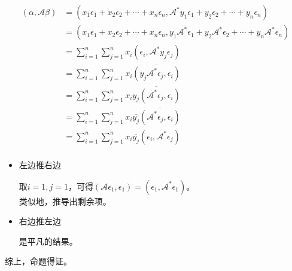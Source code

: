 \documentclass{article}
\begin{document}
\begin{align*}
  (\alpha, \mathscr{A}\beta)
   & = (x_1 \epsilon_1 + x_2 \epsilon_2 + \cdots + x_n \epsilon_n, \mathscr{A}^* y_1 \epsilon_1 + y_2 \epsilon_2 + \cdots + y_n \epsilon_n)                           \\
   & = (x_1 \epsilon_1 + x_2 \epsilon_2 + \cdots + x_n \epsilon_n, y_1 \mathscr{A}^* \epsilon_1 + y_2 \mathscr{A}^*\epsilon_2 + \cdots + y_n \mathscr{A}^*\epsilon_n) \\
   & = \sum \limits_{i = 1}^n \sum \limits_{j = 1}^n x_i (\epsilon_i, \mathscr{A}^* y_j \epsilon_j)                                                                   \\
   & = \sum \limits_{i = 1}^n \sum \limits_{j = 1}^n x_i \overline{(y_j \mathscr{A}^* \epsilon_j, \epsilon_i)}                                                        \\
   & = \sum \limits_{i = 1}^n \sum \limits_{j = 1}^n x_i \overline{y_j(\mathscr{A}^* \epsilon_j, \epsilon_i)}                                                         \\
   & = \sum \limits_{i = 1}^n \sum \limits_{j = 1}^n x_i \overline{y_j}\overline{(\mathscr{A}^* \epsilon_j, \epsilon_i)}                                              \\
   & = \sum \limits_{i = 1}^n \sum \limits_{j = 1}^n x_i \overline{y_j}(\epsilon_i, \mathscr{A}^* \epsilon_j)                                                         \\
\end{align*}
\begin{itemize}
  \item 左边推右边

        取$i = 1, j = 1$，可得$(\mathscr{A}\epsilon_1, \epsilon_1) = (\epsilon_1, \mathscr{A}^*\epsilon_1)$。 \\
        类似地，推导出剩余项。

  \item 右边推左边

        是平凡的结果。
\end{itemize}
综上，命题得证。
\end{document}
